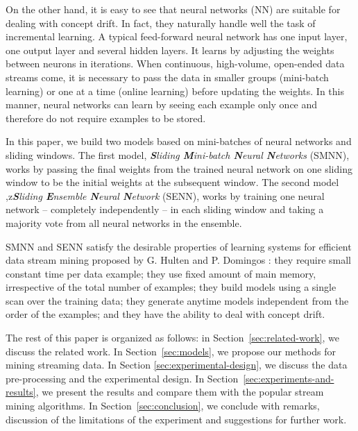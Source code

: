 \documentclass[conference]{IEEEtran}
\begin{document}
		On the other hand, it is easy to see that neural networks (NN) are suitable for dealing with concept drift. In fact, they naturally handle well the task of incremental learning. A typical feed-forward neural network has one input layer, one output layer and several hidden layers. It learns by adjusting the weights between neurons in iterations. When continuous, high-volume, open-ended data streams come, it is necessary to pass the data in smaller groups (mini-batch learning) or one at a time (online learning) before updating the weights. In this manner, neural networks can learn by seeing each example only once and therefore do not require examples to be stored. 
		
		In this paper, we build two models based on mini-batches of neural networks and sliding windows.
		The first model, \emph{\textbf{S}liding \textbf{M}ini-batch  \textbf{N}eural \textbf{N}etworks} (SMNN), works by passing the final weights from the trained neural network on one sliding window to be the initial weights at the subsequent window. The second model ,z\emph{\textbf{S}liding \textbf{E}nsemble  \textbf{N}eural \textbf{N}etwork} (SENN), works by training one neural network -- completely independently -- in each sliding window and taking a majority vote from all neural networks in the ensemble. 
		
		SMNN and SENN satisfy the desirable properties of learning systems for efficient data stream mining proposed by G. Hulten and P. Domingos \cite{Domingos}: they require small constant time per data example; they use fixed amount of main memory, irrespective of the total number of examples; they build models using a single scan over the training data; they generate anytime models independent from the order of the examples; and they have the ability to deal with concept drift. 
		
		The rest of this paper is organized as follows: in Section~\ref{sec:related-work}, we discuss the related work. In Section~\ref{sec:models}, we propose our methods for mining streaming data. In Section \ref{sec:experimental-design}, we discuss the data pre-processing and the experimental design. In Section~\ref{sec:experiments-and-results}, we present the results and compare them with the popular stream mining algorithms. In Section~\ref{sec:conclusion}, we conclude with remarks, discussion of the limitations of the experiment and suggestions for further work.
		
\end{document}
